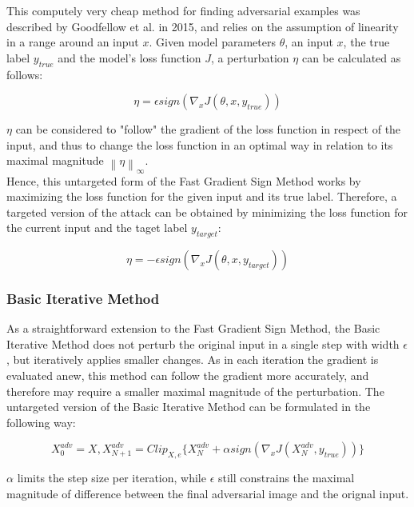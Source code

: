 \documentclass[draft,final]{vutinfth} %
\newcommand{\norm}[1]{\left\lVert#1\right\rVert}
\begin{document}
This computely very cheap method for finding adversarial examples was described by Goodfellow et al. in 2015, and relies on the assumption of linearity in a range around an input $x$.
Given model parameters $\theta$, an input $x$, the true label $y_{true}$ and the model's loss function $J$, a perturbation $\eta$ can be calculated as follows:

\begin{equation}
	\eta = \epsilon sign(\nabla_xJ(\theta, x, y_{true}))
\end{equation}

$\eta$ can be considered to "follow" the gradient of the loss function in respect of the input, and thus to change the loss function in an optimal way in relation to its maximal magnitude $\norm{\eta}_\infty$.
\\
Hence, this untargeted form of the Fast Gradient Sign Method works by maximizing the loss function for the given input and its true label.
Therefore, a targeted version of the attack can be obtained by minimizing the loss function for the current input and the taget label $y_{target}$:

\begin{equation}
	\eta = -\epsilon sign(\nabla_xJ(\theta, x, y_{target}))
\end{equation}
\cite{Goodfellow2015}

\subsubsection{Basic Iterative Method}

As a straightforward extension to the Fast Gradient Sign Method, the Basic Iterative Method does not perturb the original input in a single step with width $\epsilon$, but iteratively applies smaller changes. As in each iteration the gradient is evaluated anew, this method can follow the gradient more accurately, and therefore may require a smaller maximal magnitude of the perturbation. The untargeted version of the Basic Iterative Method can be formulated in the following way:

\begin{equation}
	X^{adv}_0 = X, X^{adv}_{N+1} = Clip_{X,e}\{X^{adv}_{N} + \alpha sign(\nabla_xJ(X^{adv}_{N}, y_{true})) \}
\end{equation}

$\alpha$ limits the step size per iteration, while $\epsilon$ still constrains the maximal magnitude of difference between the final adversarial image and the orignal input.
\end{document}
